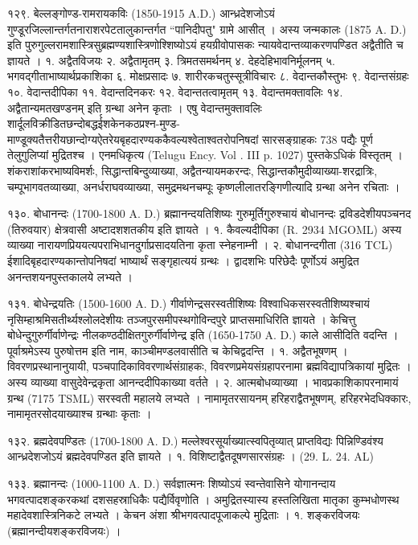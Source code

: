 १२९. बेल्लङ्गोण्ड-रामरायकविः (1850-1915 A.D.)
आन्ध्रदेशजोऽयं गुण्डूरजिल्लान्तर्गतनाराशरपेटतालुकान्तर्गत ``पानिदीपतु" ग्रामे आसीत् । अस्य जन्मकालः (1875 A. D.) इति पुरुगुल्लरामशास्त्रिसुब्रह्मण्यशास्त्रिणोश्शिष्योऽयं हयग्रीवोपासकः न्यायवेदान्तव्याकरणपण्डित अद्वैतीति च ज्ञायते ।
१. अद्वैतविजयः २. अद्वैतामृतम् ३. त्रिमतसमर्थनम् ४. देहदेहिभावनिर्मूलनम् ५. भगवद्गीताभाष्यार्थप्रकाशिका ६. मोक्षप्रसादः ७. शारीरकचतुस्सूत्रीविचारः ८. वेदान्तकौस्तुभः ९. वेदान्तसंग्रहः १०. वेदान्तदीपिका ११. वेदान्तदिनकरः १२. वेदान्ततत्वामृतम् १३. वेदान्तमक्तावलिः १४. अद्वैतान्यमतखण्डनम् इति ग्रन्था अनेन कृताः । एषु वेदान्तमुक्तावलिः शार्दूलविक्रीडितछन्दोबद्धर्ईशकेनकठप्रश्न-मुण्ड-माण्डूक्यतैत्तरीयछान्दोग्यऐतरेयबृहदारण्यककैवल्यश्वेताश्वतरोपनिषदां सारसङ्ग्राहकः 738 पद्यैः पूर्ण तेलुगुलिप्यां मुद्रितश्च । एनमधिकृत्य (Telugu Ency. Vol . III p. 1027) पुस्तकेऽधिकं विस्तृतम् । शंकराशांकरभाष्यविमर्शः, सिद्धान्तबिन्दुव्याख्या, अद्वैतन्यायमकरन्दः, सिद्धान्तकौमुदीव्याख्या-शरद्रात्रिः, चम्पूभागवतव्याख्या, अनर्धराघवव्याख्या, समुद्रमथनचम्पूः कृष्णलीलातरङ्गिणीत्यादि ग्रन्था अनेन रचिताः ।

१३०. बोधानन्दः (1700-1800 A. D.)
ब्रह्मानन्दयतिशिष्यः गुरुमूर्तिगुरुश्चायं बोधानन्दः द्रविडदेशीयपञ्चनद (तिरुवयार) क्षेत्रवासी अष्टादशशतकीय इति ज्ञायते ।
१. कैवल्यदीपिका (R. 2934 MGOML) अस्य व्याख्या नारायणप्रिययत्यपराभिधानदुर्गाप्रसादयतिना कृता स्नेहनाम्नी ।
२. बोधानन्दगीता (316 TCL)
ईशादिबृहदारण्यकान्तोपनिषदां भाष्यार्थं सङ्गृहात्ययं ग्रन्थः । द्वादशभिः परिछेदैः पूर्णोऽयं अमुद्रित अनन्तशयनपुस्तकालये लभ्यते ।

१३१. बोधेन्द्रयतिः (1500-1600 A. D.)
गीर्वाणेन्द्रसरस्वतीशिष्यः विश्वाधिकसरस्वतीशिष्यश्चायं नृसिम्हाश्रमिसतीर्थ्यश्लोलदेशीयः तञ्जपुरसमीपस्थगोविन्दपुरे प्राप्तसमाधिरिति ज्ञायते । केचित्तु बोधेन्दुगुरुर्गीर्वाणेन्द्रः नीलकण्ठदीक्षितगुरुर्गीर्वाणेन्द्र इति (1650-1750 A. D.) काले आसीदिति वदन्ति । पूर्वाश्रमेऽस्य पुरुषोत्तम इति नाम, काञ्चीमण्डलवासीति च केचिद्वदन्ति ।
१. अद्वैतभूषणम् । विवरणप्रस्थानानुयायी, पञ्चपादिकाविवरणार्थसंग्राहकः, विवरणप्रमेयसंग्रहापरनामा ब्रह्मविद्यापत्रिकायां मुद्रितः । अस्य व्याख्या वासुदेवेन्द्रकृता आनन्ददीपिकाख्या वर्तते ।
२. आत्मबोधव्याख्या । भावप्रकाशिकापरनामायं ग्रन्थ (7175 TSML) सरस्वती महालये लभ्यते । नामामृतरसायनम् हरिहराद्वैतभूषणम्, हरिहरभेदधिक्कारः, नामामृतरसोदयाख्याश्च ग्रन्थाः कृताः ।

१३२. ब्रह्मदेवपण्डितः (1700-1800 A. D.)
मल्लेश्वरसूर्याख्यात्स्वपितृव्यात् प्राप्तविद्यः पिन्निण्डिवंश्य आन्ध्रदेशजोऽयं ब्रह्मदेवपण्डित इति ज्ञायते ।
१. विशिष्टाद्वैतदूषणसारसंग्रहः । (29. L. 24. AL)

१३३. ब्रह्मानन्दः (1000-1100 A. D.)
सर्वज्ञात्मनः शिष्योऽयं स्वन्तेवासिने योगानन्दाय भगवत्पादशङ्करकथां दशसहस्राधिकैः पद्यैर्विवृणोति । अमुद्रितस्यास्य हस्तलिखिता मातृका कुम्भधोणस्थ महादेवशास्त्रिनिकटे लभ्यते । केचन अंशा श्रीभगवत्पादपूजाकल्पे मुद्रिताः ।
१. शङ्करविजयः (ब्रह्मानन्दीयशङ्करविजयः) ।

